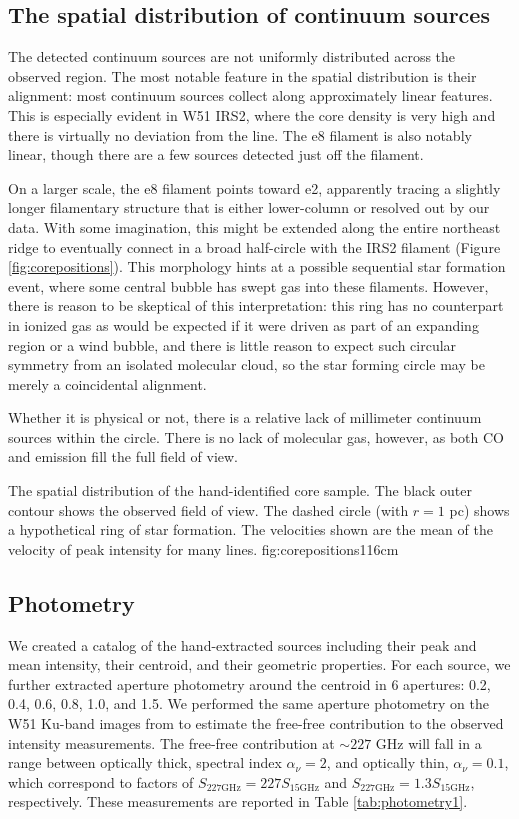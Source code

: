 \documentclass[twocolumn]{aastex61}
\begin{document}
\subsection{The spatial distribution of continuum sources}
\label{sec:corespatialdistribution}
The detected continuum sources are not uniformly distributed across the
observed region.  The most notable feature in the spatial distribution is their
alignment: most continuum sources collect along approximately linear features.
This is especially evident in W51 IRS2, where the core density is very high and
there is virtually no deviation from the line.  The e8 filament is also notably
linear, though there are a few sources detected just off the filament. 

On a larger scale, the e8 filament points toward e2, apparently tracing a
slightly longer filamentary structure that is either lower-column or resolved
out by our data.  With some imagination, this might be extended along the
entire northeast ridge to eventually connect in a broad half-circle with the
IRS2 filament (Figure \ref{fig:corepositions}).  This morphology hints at a
possible sequential star formation event, where some central bubble has swept
gas into these filaments.  However, there is reason to be skeptical of this
interpretation: this ring has no counterpart in ionized gas as would be
expected if it were driven as part of an expanding \hii region or a wind
bubble, and there is little reason to expect such circular symmetry from an
isolated molecular cloud, so the star forming circle may be merely a
coincidental alignment.

Whether it is physical or not, there is a relative lack of millimeter continuum
sources within the circle.  There is no lack of molecular gas, however, as both
CO and \formaldehyde emission fill the full field of view.

{The spatial distribution of the hand-identified core sample.
The black outer contour shows the observed field of view.  The dashed circle
(with $r=1$ pc) shows a hypothetical ring of star formation.
The velocities shown are the mean of the velocity of peak intensity for many
lines.
}{fig:corepositions}{1}{16cm}


\subsection{Photometry}
\label{sec:photometry}
We created a catalog of the hand-extracted sources including their peak and mean
intensity, their centroid, and their geometric properties.  For each source,
we further extracted aperture photometry around the centroid in 6 apertures:
0.2, 0.4, 0.6, 0.8, 1.0, and 1.5\arcsec.  We performed the same aperture
photometry on the W51 Ku-band images from \citet{Ginsburg2016a} to estimate the
free-free contribution to the observed intensity measurements.  The
free-free contribution at $\sim227$ GHz will fall in a range between optically
thick, spectral index $\alpha_\nu=2$, and optically thin, $\alpha_\nu=0.1$,
which correspond to factors of $S_{227 \mathrm{GHz}} = 227 S_{15 \mathrm{GHz}}$
and $S_{227 \mathrm{GHz}} = 1.3 S_{15 \mathrm{GHz}}$, respectively.  These
measurements are reported in Table
\ref{tab:photometry1}.
\end{document}
